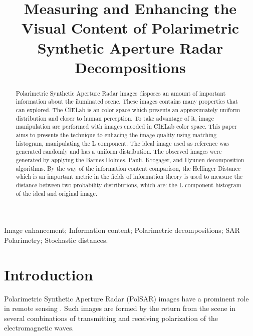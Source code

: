 \documentclass{article}
\title{Measuring and Enhancing the Visual Content of Polarimetric Synthetic Aperture Radar Decompositions}
\begin{document}
    \maketitle
    \begin{abstract}
    Polarimetric Synthetic Aperture Radar images disposes an amount of important information about the iluminated scene. These images contains many properties that can explored. The CIELab is an color space which presents an approximately uniform distribution and closer to human perception. To take advantage of it, image manipulation are performed with images encoded in CIELab color space. This paper aims to presents the technique to enhacing the image quality using matching histogram, manipulating the L component. The ideal image used as reference was generated randomly and has a uniform distribution. The observed images were generated by applying the Barnes-Holmes, Pauli, Krogager, and Hyunen decomposition algorithms.
    By the way of the information content comparison, the Hellinger Distance which is an important metric in the fields of information theory is used to measure the distance between two probability distributions, which are: the L component histogram of the ideal and original image. 
    
    \end{abstract}
    \begin{keywords}
    Image enhancement;
    Information content;
    Polarimetric decompositions;
    SAR Polarimetry;
    Stochastic distances.
    \end{keywords}
    \section{Introduction}
    \label{sec:intro}
    
    Polarimetric Synthetic Aperture Radar (PolSAR) images have a prominent role in remote sensing \citep{HolarisationApplicationsRemoteSensing,LeePottier2009PolarimetricRadarImaging}.
    Such images are formed by the return from the scene in several combinations of transmitting and receiving polarization of the electromagnetic waves.
    
\end{document}
